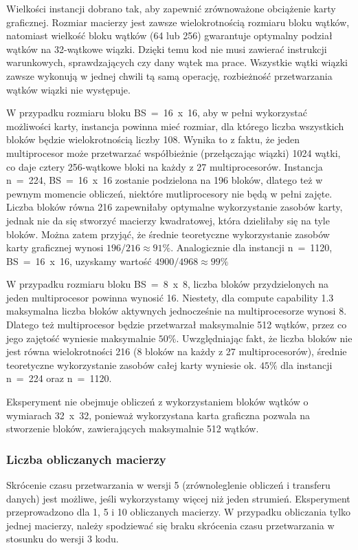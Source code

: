 \documentclass[12pt,a4paper]{article}
\begin{document}
Wielkości instancji dobrano tak, aby zapewnić zrównoważone obciążenie karty graficznej. Rozmiar macierzy jest zawsze wielokrotnością rozmiaru bloku wątków, natomiast wielkość bloku wątków (64 lub 256) gwarantuje optymalny podział wątków na 32-wątkowe wiązki. Dzięki temu kod nie musi zawierać instrukcji warunkowych, sprawdzających czy dany wątek ma prace. Wszystkie wątki wiązki zawsze wykonują w jednej chwili tą samą operację, rozbieżność przetwarzania wątków wiązki nie występuje.

W przypadku rozmiaru bloku BS~=~16~x~16, aby w pełni wykorzystać możliwości karty, instancja powinna mieć rozmiar, dla którego liczba wszystkich bloków będzie wielokrotnością liczby 108. Wynika to z faktu, że jeden multiprocesor może przetwarzać współbieżnie (przełączając wiązki) 1024 wątki, co daje cztery 256-wątkowe bloki na każdy z 27 multiprocesorów. Instancja  n~=~224, BS~=~16~x~16 zostanie podzielona na 196 bloków, dlatego też w pewnym momencie obliczeń, niektóre mutliprocesory nie będą w pełni zajęte. Liczba bloków równa 216 zapewniłaby optymalne wykorzystanie zasobów karty, jednak nie da się stworzyć macierzy kwadratowej, która dzieliłaby się na tyle bloków. Można zatem przyjąć, że średnie teoretyczne wykorzystanie zasobów karty graficznej wynosi $196 / 216 \approx 91\% $. Analogicznie dla instancji  n~=~1120, BS~=~16~x~16, uzyskamy wartość $4900 / 4968 \approx 99\% $

W przypadku rozmiaru bloku  BS~=~8~x~8, liczba bloków przydzielonych na jeden multiprocesor powinna wynosić 16. Niestety, dla compute capability 1.3 maksymalna liczba bloków aktywnych jednocześnie na multiprocesorze wynosi 8. Dlatego też multiprocesor będzie przetwarzał maksymalnie 512 wątków, przez co jego zajętość wyniesie maksymalnie $50\%$.  Uwzględniając fakt, że liczba bloków nie jest równa wielokrotności 216 (8 bloków na każdy z 27 multiprocesorów), średnie teoretyczne wykorzystanie zasobów całej karty wyniesie ok. $45\%$ dla instancji n~=~224 oraz n~=~1120.

Eksperyment nie obejmuje obliczeń z wykorzystaniem bloków wątków o wymiarach 32~x~32, ponieważ wykorzystana karta graficzna pozwala na stworzenie bloków, zawierających maksymalnie 512 wątków.


\subsubsection*{Liczba obliczanych macierzy}

Skrócenie czasu przetwarzania w wersji 5 (zrównoleglenie obliczeń i transferu danych) jest możliwe, jeśli wykorzystamy więcej niż jeden strumień. Eksperyment przeprowadzono dla 1, 5 i 10 obliczanych macierzy. W przypadku obliczania tylko jednej macierzy, należy spodziewać się braku skrócenia czasu przetwarzania w stosunku do wersji 3 kodu.
\end{document}
